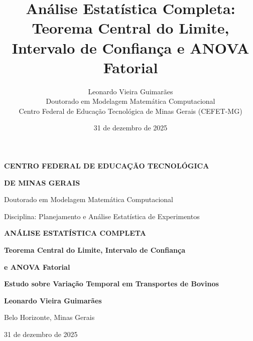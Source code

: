 \documentclass[12pt,a4paper]{article}
\title{\Large \textbf{Análise Estatística Completa:\\
       Teorema Central do Limite, Intervalo de Confiança e ANOVA Fatorial}}
\author{Leonardo Vieira Guimarães\\
        Doutorado em Modelagem Matemática Computacional\\
        Centro Federal de Educação Tecnológica de Minas Gerais (CEFET-MG)}
\date{31 de dezembro de 2025}
\begin{document}
\begin{titlepage}
    \thispagestyle{empty}
    \centering
    
    \vspace*{1cm}
    
    {\Large \textbf{CENTRO FEDERAL DE EDUCAÇÃO TECNOLÓGICA}}
    
    {\Large \textbf{DE MINAS GERAIS}}
    
    \vspace{1cm}
    
    {\normalsize Doutorado em Modelagem Matemática Computacional}
    
    \vspace{0.5cm}
    
    {\normalsize Disciplina: Planejamento e Análise Estatística de Experimentos}
    
    \vspace{3.5cm}
    
    {\LARGE \textbf{ANÁLISE ESTATÍSTICA COMPLETA}}
    
    \vspace{0.8cm}
    
    {\LARGE \textbf{Teorema Central do Limite, Intervalo de Confiança}}
    
    \vspace{0.3cm}
    
    {\LARGE \textbf{e ANOVA Fatorial}}
    
    \vspace{3.5cm}
    
    {\Large \textbf{Estudo sobre Variação Temporal em Transportes de Bovinos}}
    
    \vspace{2cm}
    
   
    
    \vspace{0.3cm}
    
    {\large \textbf{Leonardo Vieira Guimarães}}
    
    \vspace{0.2cm}
    
   
    
    \vfill
    
    \vspace{1cm}
    
    {\normalsize Belo Horizonte, Minas Gerais}
    
    \vspace{0.2cm}
    
    {\normalsize 31 de dezembro de 2025}
    
\end{titlepage}
\end{document}
